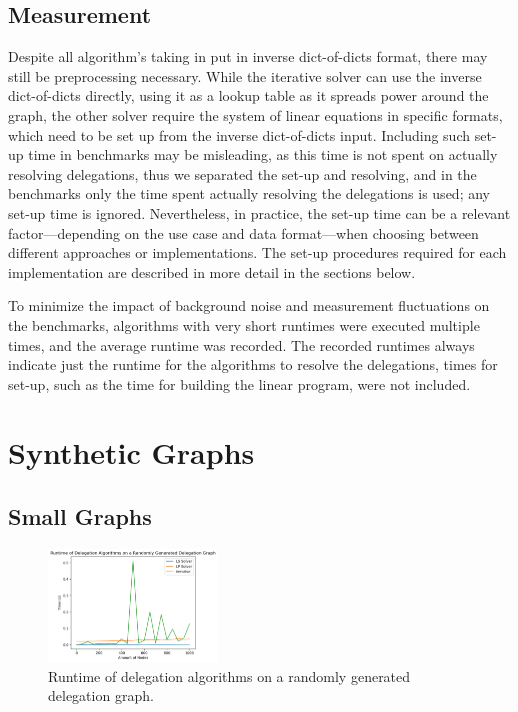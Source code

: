 \subsection{Measurement}

Despite all algorithm's taking in put in inverse dict-of-dicts format, there may still be preprocessing necessary. While the iterative solver can use the inverse dict-of-dicts directly, using it as a lookup table as it spreads power around the graph, the other solver require the system of linear equations in specific formats, which need to be set up from the inverse dict-of-dicts input. Including such set-up time in benchmarks may be misleading, as this time is not spent on actually resolving delegations, thus we separated the set-up and resolving, and in the benchmarks only the time spent actually resolving the delegations is used; any set-up time is ignored. Nevertheless, in practice, the set-up time can be a relevant factor—depending on the use case and data format—when choosing between different approaches or implementations. The set-up procedures required for each implementation are described in more detail in the sections below.

To minimize the impact of background noise and measurement fluctuations on the benchmarks, algorithms with very short runtimes were executed multiple times, and the average runtime was recorded. The recorded runtimes always indicate just the runtime for the algorithms to resolve the delegations, times for set-up, such as the time for building the linear program, were not included. 


\section{Synthetic Graphs}

\subsection{Small Graphs}
\label{subsec:small_graphs}

\begin{figure}[h]
    \centering
    \includegraphics[width=0.4\textwidth]{0-1000_random}
    \caption{Runtime of delegation algorithms on a randomly generated delegation graph.}
    \label{fig:random-small}
\end{figure}

